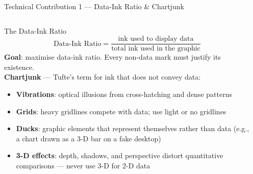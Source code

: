 \documentclass[aspectratio=169,10pt]{beamer}
\begin{document}
\begin{frame}{Technical Contribution 1 — Data-Ink Ratio \& Chartjunk}
  \begin{columns}[T]
      \begin{block}{The Data-Ink Ratio}
        \[
          \text{Data-Ink Ratio} =
          \frac{\text{ink used to display data}}
               {\text{total ink used in the graphic}}
        \]
        \textbf{Goal}: maximise data-ink ratio.
        Every non-data mark must justify its existence.\\[5pt]
        \textbf{Chartjunk} — Tufte's term for ink that does not
        convey data:
        \begin{itemize}
          \item \textbf{Vibrations}: optical illusions from
                cross-hatching and dense patterns
          \item \textbf{Grids}: heavy gridlines compete with data;
                use light or no gridlines
          \item \textbf{Ducks}: graphic elements that represent
                themselves rather than data
                (e.g., a chart drawn as a 3-D bar on a fake desktop)
          \item \textbf{3-D effects}: depth, shadows, and perspective
                distort quantitative comparisons — never use 3-D
                for 2-D data
        \end{itemize}
      \end{block}

      \begin{center}
\end{center}
\end{columns}
\end{frame}
\end{document}
